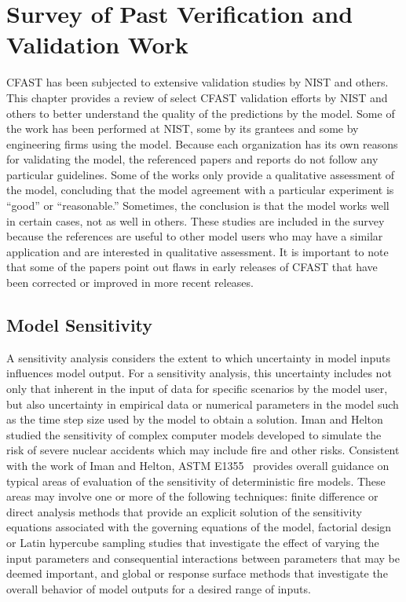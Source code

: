 \chapter{Survey of Past Verification and Validation Work}

\label{Survey_Chapter}

CFAST has been subjected to extensive validation studies by NIST and others. This chapter provides a review of select CFAST validation efforts by NIST and others to better understand the quality of the predictions by the model. Some of the work has been  performed at NIST, some by its grantees and some by engineering firms using the model.  Because each organization has its  own reasons for  validating the model, the  referenced papers and reports do not follow any particular guidelines. Some of the works only provide  a qualitative assessment  of the model,  concluding that the  model  agreement with  a  particular  experiment  is ``good''  or ``reasonable.'' Sometimes, the conclusion is that the model works well in certain cases, not as well in others. These studies are included in the survey because the references  are useful to other model users who may have a similar application  and are interested in qualitative assessment. It is important to note  that some of the papers point out flaws in early releases of CFAST that have been corrected or improved in more recent  releases.

\section{Model Sensitivity}

A sensitivity analysis considers the extent to which uncertainty in model inputs influences model output.  For a sensitivity analysis, this uncertainty includes not only that inherent in the input of data for specific scenarios by the model user, but also uncertainty in empirical data or numerical parameters in the model such as the time step size used by the model to obtain a solution. Iman and Helton~\cite{Iman:1988} studied the sensitivity of complex computer models developed to simulate the risk of severe nuclear accidents which may include fire and other risks. Consistent with the work of Iman and Helton, ASTM E1355~\cite{CFAST:ASTM:E1355} provides overall guidance on typical areas of evaluation of the sensitivity of deterministic fire models.  These areas may involve one or more of the following techniques: finite difference or direct analysis methods that provide an explicit solution of the sensitivity equations associated with the governing equations of the model, factorial design or Latin hypercube sampling studies that investigate the effect of varying the input parameters and consequential interactions between parameters that may be deemed important, and global or response surface methods that investigate the overall behavior of model outputs for a desired range of inputs.

